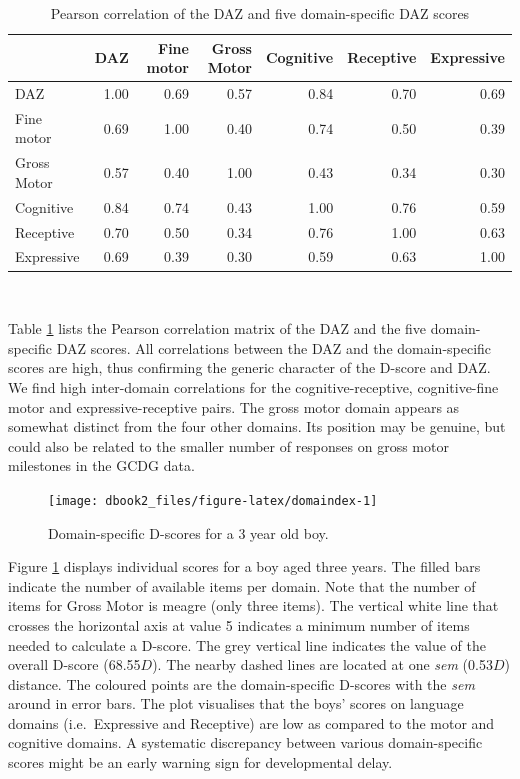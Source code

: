 \documentclass[
]{book}
\begin{document}
\begin{table}

\caption{\label{tab:domaincor}Pearson correlation of the DAZ and five domain-specific DAZ scores}
\centering
\begin{tabular}[t]{l|r|r|r|r|r|r}
\hline
  & DAZ & Fine motor & Gross Motor & Cognitive & Receptive & Expressive\\
\hline
DAZ & 1.00 & 0.69 & 0.57 & 0.84 & 0.70 & 0.69\\
\hline
Fine motor & 0.69 & 1.00 & 0.40 & 0.74 & 0.50 & 0.39\\
\hline
Gross Motor & 0.57 & 0.40 & 1.00 & 0.43 & 0.34 & 0.30\\
\hline
Cognitive & 0.84 & 0.74 & 0.43 & 1.00 & 0.76 & 0.59\\
\hline
Receptive & 0.70 & 0.50 & 0.34 & 0.76 & 1.00 & 0.63\\
\hline
Expressive & 0.69 & 0.39 & 0.30 & 0.59 & 0.63 & 1.00\\
\hline
\end{tabular}
\end{table}

~

Table \ref{tab:domaincor} lists the Pearson correlation matrix of the DAZ and the five domain-specific DAZ scores. All correlations between the DAZ and the domain-specific scores are high, thus confirming the generic character of the D-score and DAZ. We find high inter-domain correlations for the cognitive-receptive, cognitive-fine motor and expressive-receptive pairs. The gross motor domain appears as somewhat distinct from the four other domains. Its position may be genuine, but could also be related to the smaller number of responses on gross motor milestones in the GCDG data.

\begin{figure}

{\centering \texttt{[image: dbook2\_files/figure-latex/domaindex-1]} 

}

\caption{Domain-specific D-scores for a 3 year old boy.}\label{fig:domaindex}
\end{figure}



Figure \ref{fig:domaindex} displays individual scores for a boy aged three years. The filled bars indicate the number of available items per domain. Note that the number of items for Gross Motor is meagre (only three items). The vertical white line that crosses the horizontal axis at value 5 indicates a minimum number of items needed to calculate a D-score. The grey vertical line indicates the value of the overall D-score (68.55\(D\)). The nearby dashed lines are located at one \emph{sem} (0.53\(D\)) distance. The coloured points are the domain-specific D-scores with the \emph{sem} around in error bars. The plot visualises that the boys' scores on language domains (i.e.~Expressive and Receptive) are low as compared to the motor and cognitive domains. A systematic discrepancy between various domain-specific scores might be an early warning sign for developmental delay.
\end{document}
